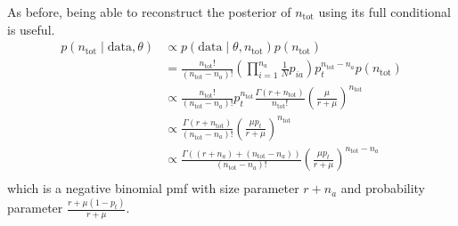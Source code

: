 \documentclass[thesis.tex]{subfiles}
\begin{document}
As before, being able to reconstruct the posterior of $n_\text{tot}$
using its full conditional is useful.
\begin{align}
p(n_\text{tot} \mid \text{data}, \theta)
&\propto p(\text{data} \mid \theta, n_\text{tot}) p(n_\text{tot}) \\
&= \frac{n_\text{tot}!}{(n_\text{tot}-n_a)!} \left( \prod_{i=1}^{n_a} \frac{1}{N} p_{ia} \right) p_t^{n_\text{tot}-n_a} p(n_\text{tot}) \\
&\propto \frac{n_\text{tot}!}{(n_\text{tot}-n_a)!} p_t^{n_\text{tot}} \frac{\Gamma(r + n_\text{tot})}{n_\text{tot}!} \left( \frac{\mu}{r + \mu} \right)^{n_\text{tot}}  \\
&\propto \frac{\Gamma(r + n_\text{tot})}{(n_\text{tot}-n_a)!} \left( \frac{\mu p_t}{r + \mu} \right)^{n_\text{tot}}  \\
&\propto \frac{\Gamma((r + n_a) + (n_\text{tot}- n_a))}{(n_\text{tot}-n_a)!} \left( \frac{\mu p_t}{r + \mu} \right)^{n_\text{tot}-n_a}  \\
\end{align}
which is a negative binomial pmf with size parameter $r + n_a$ and
probability parameter $\frac{r+\mu(1-p_t)}{r+\mu}$.
\end{document}
